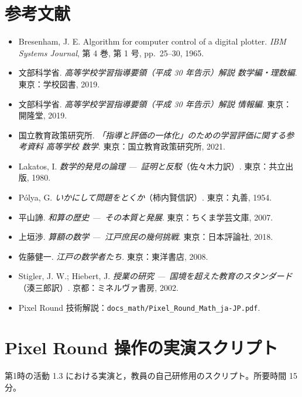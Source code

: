 \documentclass[12pt,a4paper]{scrartcl}
\begin{document}
\section{参考文献}

\begin{itemize}[leftmargin=1.3em,itemsep=0.2em,topsep=0.3em]
  \item Bresenham, J. E. Algorithm for computer control of a digital plotter. \emph{IBM Systems Journal}, 第 4 巻, 第 1 号, pp.~25--30, 1965.
  \item 文部科学省. \emph{高等学校学習指導要領（平成 30 年告示）解説 数学編・理数編}. 東京：学校図書, 2019.
  \item 文部科学省. \emph{高等学校学習指導要領（平成 30 年告示）解説 情報編}. 東京：開隆堂, 2019.
  \item 国立教育政策研究所. \emph{「指導と評価の一体化」のための学習評価に関する参考資料 高等学校 数学}. 東京：国立教育政策研究所, 2021.
  \item Lakatos, I. \emph{数学的発見の論理 ---\, 証明と反駁}（佐々木力訳）. 東京：共立出版, 1980.
  \item Pólya, G. \emph{いかにして問題をとくか}（柿内賢信訳）. 東京：丸善, 1954.
  \item 平山諦. \emph{和算の歴史 ---\, その本質と発展}. 東京：ちくま学芸文庫, 2007.
  \item 上垣渉. \emph{算額の数学 ---\, 江戸庶民の幾何挑戦}. 東京：日本評論社, 2018.
  \item 佐藤健一. \emph{江戸の数学者たち}. 東京：東洋書店, 2008.
  \item Stigler, J. W.; Hiebert, J. \emph{授業の研究 ---\, 国境を超えた教育のスタンダード}（湊三郎訳）. 京都：ミネルヴァ書房, 2002.
  \item Pixel Round 技術解説：\texttt{docs\_math/Pixel\_Round\_Math\_ja-JP.pdf}.
\end{itemize}

\newpage
\appendix
\renewcommand{\thesection}{\Alph{section}}
\setcounter{section}{0}

\section{Pixel Round 操作の実演スクリプト}\label{ap:demo}

第1時の活動 1.3 における実演と，教員の自己研修用のスクリプト。所要時間 15 分。
\end{document}
